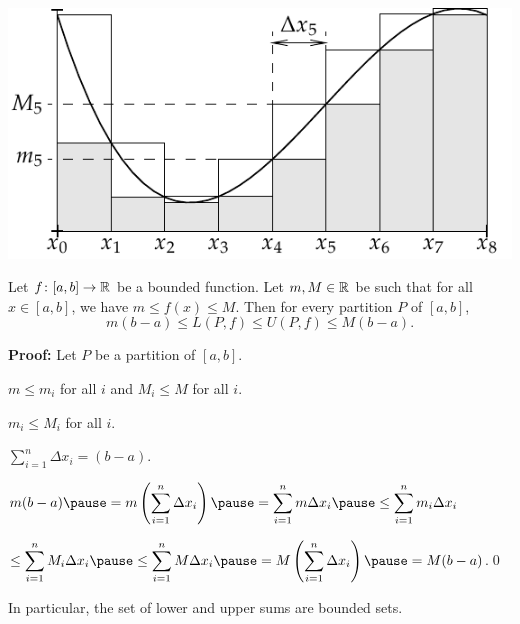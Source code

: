 \documentclass[10pt,aspectratio=149]{beamer}
\begin{document}
\begin{frame}

\begin{center}
\includegraphics{../figures/darbouxfig}
\end{center}

\end{frame}

\begin{frame}

\begin{proposition}
Let $f \colon [a,b] \to {\mathbb{R}}$ be a bounded function.  Let $m, M \in {\mathbb{R}}$ be 
such that for all $x \in [a,b]$, we have $m \leq f(x) \leq M$.
\pause
Then for every partition $P$
of $[a,b]$,
\[
m(b-a) \leq
L(P,f) \leq U(P,f)
\leq M(b-a) .
\]
\end{proposition}

\pause
\textbf{Proof:}
Let $P$ be a partition of $[a,b]$.

\pause
$m \leq m_i$ for all $i$ and $M_i \leq M$ for all $i$.

\pause
$m_i \leq M_i$ for all $i$.

\pause
$\sum_{i=1}^n \Delta x_i = (b-a)$.

\pause
\medskip

\thus
\quad
$\displaystyle
m(b-a)
\pause
=
m \left( \sum_{i=1}^n \Delta x_i \right)
\pause
=
\sum_{i=1}^n m \Delta x_i
\pause
\leq
\sum_{i=1}^n m_i \Delta x_i 
$

\pause
\medskip

\hfill\hfill\hfill\hfill\hfill\hfill\hfill\hfill
\hfill\hfill\hfill\hfill\hfill\hfill\hfill\hfill
$\displaystyle
\leq
\sum_{i=1}^n M_i \Delta x_i
\pause
\leq
\sum_{i=1}^n M \Delta x_i 
\pause
=
M \left( \sum_{i=1}^n \Delta x_i \right)
\pause
=
M(b-a)
$.\qed

\pause
\medskip

In particular, the set of lower and
upper sums are bounded sets.
\end{frame}
\end{document}
